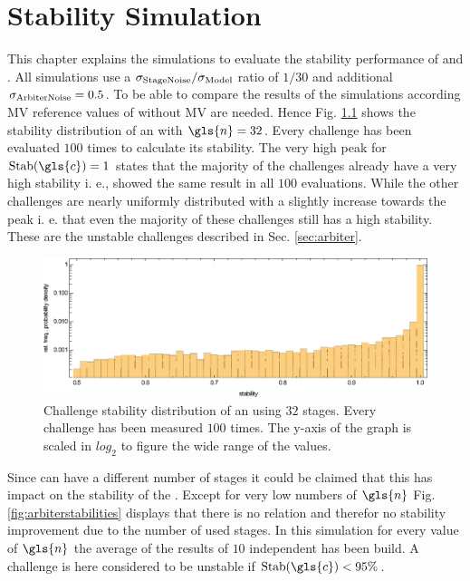 \chapter{Stability Simulation}
\label{cap:stabilitysimulation}

This chapter explains the simulations to evaluate the stability performance of \mpufs and \mxpufs.
All simulations use a $\sigma_{\mathrm{Stage Noise}}/\sigma_{\mathrm{Model}}$ ratio of $1/30$ and additional $\sigma_{\mathrm{Arbiter Noise}} = 0.5$.
To be able to compare the results of the simulations according \ac{MV} reference values of \apufs without \ac{MV} are needed.
Hence Fig. \ref{fig:arbiterstabilitydistribution} shows the stability distribution of an \apuf with $\gls{n} = 32$.
Every challenge has been evaluated $100$ times to calculate its stability.
The very high peak for $\Stab(\gls{c}) = 1$ states that the majority of the challenges already have a very high stability i. e., showed the same result in all $100$ evaluations.
While the other challenges are nearly uniformly distributed with a slightly increase towards the peak i. e. that even the majority of these challenges still has a high stability.
These are the unstable challenges described in Sec. \ref{sec:arbiter}.

\begin{figure}[ht]
\includegraphics[width=1.00\textwidth]{images/arbiter-stability-distribution-simulation.eps}
\caption{Challenge stability distribution of an \apuf using $32$ stages. Every challenge has been measured $100$ times. The y-axis of the graph is scaled in $log_2$ to figure the wide range of the values.} 
\label{fig:arbiterstabilitydistribution}
\end{figure}

Since \apufs can have a different number of stages it could be claimed that this has impact on the stability of the \puf.
Except for very low numbers of $\gls{n}$ Fig. \ref{fig:arbiterstabilities} displays that there is no relation and therefor no stability improvement due to the number of used stages. %
In this simulation for every value of $\gls{n}$ the average of the results of $10$ independent \apufs has been build.
A challenge is here considered to be unstable if $\Stab(\gls{c}) < 95 \%$.

